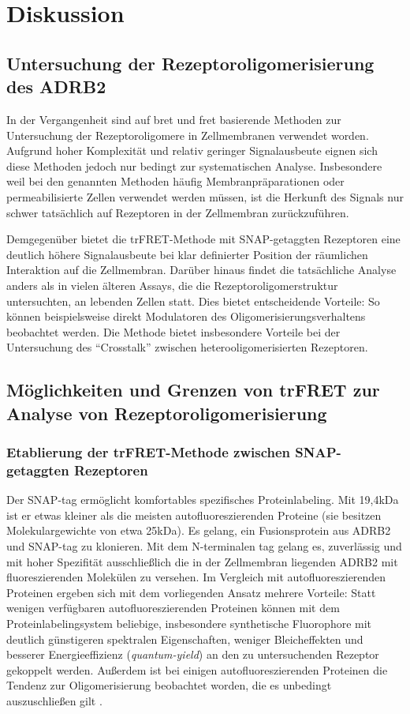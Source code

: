 \chapter{Diskussion}\label{chapter:diskussion}

\section{Untersuchung der Rezeptoroligomerisierung des ADRB2}
In der Vergangenheit sind auf \gls{bret} und \gls{fret} basierende Methoden zur Untersuchung der Rezeptoroligomere in Zellmembranen verwendet worden. Aufgrund hoher Komplexität und relativ geringer Signalausbeute eignen sich diese Methoden jedoch nur bedingt zur systematischen Analyse. Insbesondere weil bei den genannten Methoden häufig Membranpräparationen oder permeabilisierte Zellen verwendet werden müssen, ist die Herkunft des Signals nur schwer tatsächlich auf Rezeptoren in der Zellmembran zurückzuführen.

Demgegenüber bietet die trFRET-Methode mit SNAP-getaggten Rezeptoren eine deutlich höhere Signalausbeute bei klar definierter Position der räumlichen Interaktion auf die Zellmembran. Darüber hinaus findet die tatsächliche Analyse anders als in vielen älteren Assays, die die Rezeptoroligomerstruktur untersuchten, an lebenden Zellen statt. Dies bietet entscheidende Vorteile: So können beispielsweise direkt Modulatoren des Oligomerisierungsverhaltens beobachtet werden. Die Methode bietet insbesondere Vorteile bei der Untersuchung des "`Crosstalk"' zwischen heterooligomerisierten Rezeptoren. 

\section{Möglichkeiten und Grenzen von trFRET zur Analyse von Rezeptoroligomerisierung}
\label{discussion:limits}

\subsection{Etablierung der trFRET-Methode zwischen SNAP-getaggten Rezeptoren}
Der SNAP-tag ermöglicht komfortables spezifisches Proteinlabeling. Mit 19,4\si{\kilo Da} ist er etwas kleiner als die meisten autofluoreszierenden Proteine (sie besitzen Molekulargewichte von etwa 25\si{\kilo Da}). Es gelang, ein Fusionsprotein aus ADRB2 und SNAP-tag zu klonieren. Mit dem N-terminalen tag gelang es, zuverlässig und mit hoher Spezifität ausschließlich die in der Zellmembran liegenden ADRB2 mit fluoreszierenden Molekülen zu versehen. Im Vergleich mit autofluoreszierenden Proteinen ergeben sich mit dem vorliegenden Ansatz mehrere Vorteile: Statt wenigen verfügbaren autofluoreszierenden Proteinen können mit dem Proteinlabelingsystem beliebige, insbesondere synthetische Fluorophore mit deutlich günstigeren spektralen Eigenschaften, weniger Bleicheffekten und besserer Energieeffizienz (\textit{quantum-yield}) an den zu untersuchenden Rezeptor gekoppelt werden. Außerdem ist bei einigen autofluoreszierenden Proteinen die Tendenz zur Oligomerisierung beobachtet worden, die es unbedingt auszuschließen gilt \parencite{Zhang2002a, Keppler2004}.

